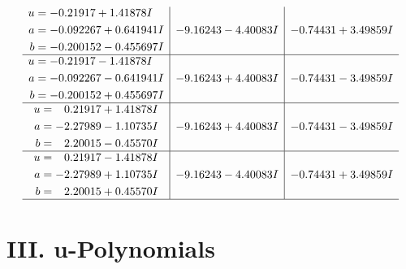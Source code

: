 \documentclass[1p]{elsarticle_modified}
\theoremstyle{definition}
\begin{document}
$$\begin{array}{c|c|c}
\begin{aligned}
u &= -0.21917 + 1.41878 I \\
a &= -0.092267 + 0.641941 I \\
b &= -0.200152 - 0.455697 I\end{aligned}
 & -9.16243 - 4.40083 I & -0.74431 + 3.49859 I \\ \hline\begin{aligned}
u &= -0.21917 - 1.41878 I \\
a &= -0.092267 - 0.641941 I \\
b &= -0.200152 + 0.455697 I\end{aligned}
 & -9.16243 + 4.40083 I & -0.74431 - 3.49859 I \\ \hline\begin{aligned}
u &= \phantom{-}0.21917 + 1.41878 I \\
a &= -2.27989 - 1.10735 I \\
b &= \phantom{-}2.20015 - 0.45570 I\end{aligned}
 & -9.16243 + 4.40083 I & -0.74431 - 3.49859 I \\ \hline\begin{aligned}
u &= \phantom{-}0.21917 - 1.41878 I \\
a &= -2.27989 + 1.10735 I \\
b &= \phantom{-}2.20015 + 0.45570 I\end{aligned}
 & -9.16243 - 4.40083 I & -0.74431 + 3.49859 I\\
 \hline 
 \end{array}$$\newpage
\newpage\renewcommand{\arraystretch}{1}
\centering \section*{ III. u-Polynomials}
\end{document}
